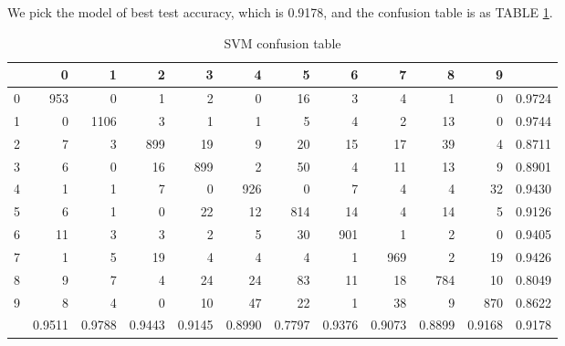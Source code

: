\documentclass[conference]{IEEEtran}
\begin{document}
We pick the model of best test accuracy, which is 0.9178, and the confusion table is as TABLE \ref{SVM confusion table}.

\begin{table}[htbp]
\tiny
  \centering
  \caption{SVM confusion table}
\begin{tabular}{|r|rrrrrrrrrr|r|}
\hline
  & 0 & 1 & 2 & 3 & 4 & 5 & 6 & 7 & 8 & 9 &  \\
\hline
0 & 953 & 0 & 1 & 2 & 0 & 16 & 3 & 4 & 1 & 0 & 0.9724 \\
1 & 0 & 1106 & 3 & 1 & 1 & 5 & 4 & 2 & 13 & 0 & 0.9744 \\
2 & 7 & 3 & 899 & 19 & 9 & 20 & 15 & 17 & 39 & 4 & 0.8711 \\
3 & 6 & 0 & 16 & 899 & 2 & 50 & 4 & 11 & 13 & 9 & 0.8901 \\
4 & 1 & 1 & 7 & 0 & 926 & 0 & 7 & 4 & 4 & 32 & 0.9430 \\
5 & 6 & 1 & 0 & 22 & 12 & 814 & 14 & 4 & 14 & 5 & 0.9126 \\
6 & 11 & 3 & 3 & 2 & 5 & 30 & 901 & 1 & 2 & 0 & 0.9405 \\
7 & 1 & 5 & 19 & 4 & 4 & 4 & 1 & 969 & 2 & 19 & 0.9426 \\
8 & 9 & 7 & 4 & 24 & 24 & 83 & 11 & 18 & 784 & 10 & 0.8049 \\
9 & 8 & 4 & 0 & 10 & 47 & 22 & 1 & 38 & 9 & 870 & 0.8622 \\
\hline
  & 0.9511 & 0.9788 & 0.9443 & 0.9145 & 0.8990 & 0.7797 & 0.9376 & 0.9073 & 0.8899 & 0.9168 & 0.9178 \\
\hline
\end{tabular}%


  \label{SVM confusion table}%
\end{table}%


\end{document}
